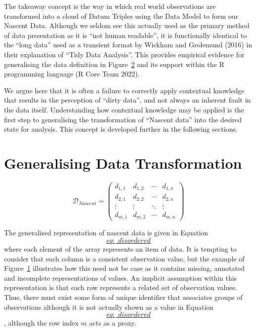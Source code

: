 \documentclass[
]{article}
\begin{document}
The takeaway concept is the way in which real world observations are
transformed into a cloud of Datum Triples using the Data Model to form
our Nascent Data. Although we seldom see this actually used as the
primary method of data presentation as it is ``not human readable'', it
is functionally identical to the ``long data'' used as a transient
format by Wickham and Grolemund (2016) in their explanation of ``Tidy
Data Analysis''. This provides empirical evidence for generalising the
data definition in Figure~\protect\hyperlink{Fig-theory-nascent-data}{2}
and its support within the R programming language (R Core Team 2022).

We argue here that it is often a failure to correctly apply contextual
knowledge that results in the perception of ``dirty data'', and not
always an inherent fault in the data itself. Understanding how
contextual knowledge may be applied is the first step to generalising
the transformation of ``Nascent data'' into the desired state for
analysis. This concept is developed further in the following sections.

\hypertarget{sec:applying-the-data-model}{%
\section{Generalising Data
Transformation}\label{sec:applying-the-data-model}}

\[\label{eq:_disordered}
    \mathscr{D}_{Nascent} =
    \begin{pmatrix}
        d_{1,1} & d_{1,2} & \cdots & d_{1,n} \\
        d_{2,1} & d_{2,2} & \cdots & d_{2,n} \\
        \vdots  & \vdots  & \ddots & \vdots  \\
        d_{m,1} & d_{m,2} & \cdots & d_{m,n} 
    \end{pmatrix}\]

The generalised representation of nascent data is given in Equation
~\protect\hyperlink{eq:_disordered}{\[eq:\_disordered\]} where each
element of the array represents an item of data. It is tempting to
consider that each column is a consistent observation value, but the
example of Figure~\protect\hyperlink{fig:suttonbonningtondata}{1}
illustrates how this need not be case as it contains missing, annotated
and incomplete representations of values. An implicit assumption within
this representation is that each row represents a related set of
observation values. Thus, there must exist some form of unique
identifier that associates groups of observations although it is not
actually shown as a value in Equation
~\protect\hyperlink{eq:_disordered}{\[eq:\_disordered\]}, although the
row index \(m\) acts as a proxy.
\end{document}
